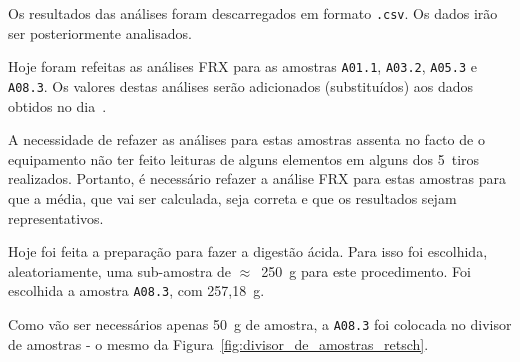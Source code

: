Os resultados das análises foram descarregados em formato \texttt{.csv}.
Os dados irão ser posteriormente analisados.



Hoje foram refeitas as análises FRX para as amostras \texttt{A01.1}, \texttt{A03.2}, \texttt{A05.3} e \texttt{A08.3}.
Os valores destas análises serão adicionados (substituídos) aos dados obtidos no dia~.

A necessidade de refazer as análises para estas amostras assenta no facto de o equipamento não ter feito leituras de alguns elementos em alguns dos 5~tiros realizados.
Portanto, é necessário refazer a análise FRX para estas amostras para que a média, que vai ser calculada, seja correta e que os resultados sejam representativos.

\hrulefill

\label{day:7-novembro-2024}

Hoje foi feita a preparação para fazer a digestão ácida.
Para isso foi escolhida, aleatoriamente, uma sub-amostra de $\approx$~250~g para este procedimento.
Foi escolhida a amostra \texttt{A08.3}, com 257,18~g.

Como vão ser necessários apenas 50~g de amostra, a \texttt{A08.3} foi colocada no divisor de amostras - o mesmo da Figura~\ref{fig:divisor_de_amostras_retsch}.

